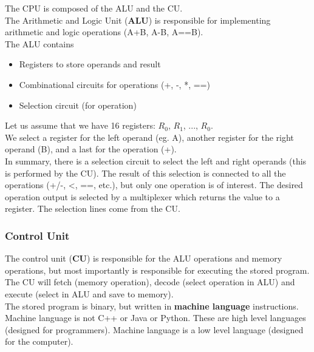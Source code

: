 \documentclass[]{article}
\begin{document}
The CPU is composed of the ALU and the CU.\\

The Arithmetic and Logic Unit (\textbf{ALU}) is responsible for implementing arithmetic and logic operations (A+B, A-B, A==B). \\

The ALU contains

\begin{itemize}
	\item Registers to store operands and result
	\item Combinational circuits for operations (+, -, *, ==)
	\item Selection circuit (for operation)
\end{itemize}

Let us assume that we have 16 registers: $R_0$, $R_1$, ..., $R_0$.\\

We select a register for the left operand (eg. A), another register for the right operand (B), and a last for the operation (+).\\

In summary, there is a selection circuit to select the left and right operands (this is performed by the CU). The result of this selection is connected to all the operations (+/-, <, ==, etc.), but only one operation is of interest. The desired operation output is selected by a multiplexer which returns the value to a register. The selection lines come from the CU.\\

\subsubsection{Control Unit}
\bigbreak

The control unit (\textbf{CU}) is responsible for the ALU operations and memory operations, but most importantly is responsible for executing the stored program.\\

The CU will fetch (memory operation), decode (select operation in ALU) and execute (select in ALU and save to memory).\\

The stored program is binary, but written in \textbf{machine language} instructions. \\

Machine language is not C++ or Java or Python. These are high level languages (designed for programmers). Machine language is a low level language (designed for the computer).\\
\end{document}
